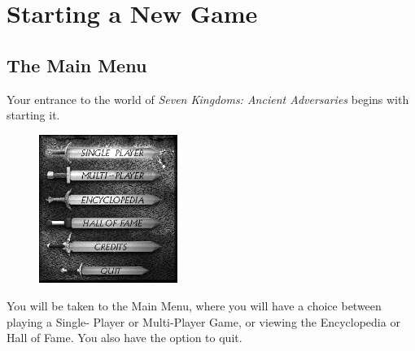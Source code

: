 
\chapter{Starting a New Game}

\section{The Main Menu}

Your entrance to the world of \textit{Seven Kingdoms: Ancient Adversaries} begins with starting it.

\begin{figure}
	\begin{center}
		\vspace{-20pt}
		\includegraphics[width=0.4\textwidth]{SWmainmenu}
	\end{center}
	\vspace{-20pt}
\end{figure}

You will be taken to the Main Menu, where you will have a choice between playing a Single- Player or Multi-Player Game, or viewing the Encyclopedia or Hall of Fame. You also have the option to quit.

